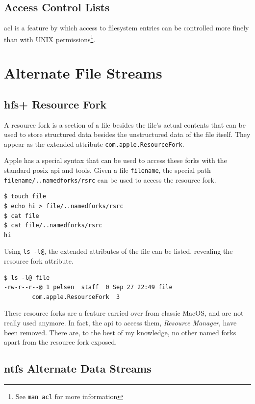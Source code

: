 \documentclass[a4paper]{article}
\begin{document}
\subsection{Access Control Lists}

\gls{acl} is a feature by which access to filesystem entries can be controlled more finely than with UNIX permissions\footnote{See \texttt{man acl} for more information}.


\section{Alternate File Streams}

\subsection{\gls{hfs+} Resource Fork}

A resource fork is a section of a file besides the file's actual contents that can be used to store structured data besides the unstructured data of the file itself. They appear as the extended attribute \verb|com.apple.ResourceFork|. 

Apple has a special syntax that can be used to access these forks with the standard \gls{posix} \gls{api} and tools. Given a file \verb|filename|, the special path \verb|filename/..namedforks/rsrc| can be used to access the resource fork.

\begin{verbatim}
$ touch file
$ echo hi > file/..namedforks/rsrc
$ cat file
$ cat file/..namedforks/rsrc
hi  
\end{verbatim}

Using \verb|ls -l@|, the extended attributes of the file can be listed, revealing the resource fork attribute.

\begin{verbatim}
$ ls -l@ file
-rw-r--r--@ 1 pelsen  staff  0 Sep 27 22:49 file
        com.apple.ResourceFork  3  
\end{verbatim}

These resource forks are a feature carried over from classic MacOS, and are not really used anymore. In fact, the \gls{api} to access them, \emph{Resource Manager}, have been removed. There are, to the best of my knowledge, no other named forks apart from the resource fork exposed.

\subsection{\gls{ntfs} Alternate Data Streams}
\end{document}
